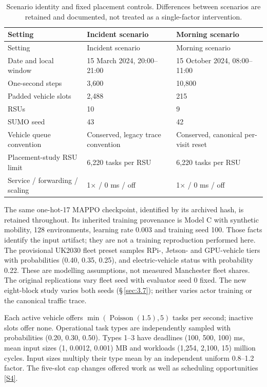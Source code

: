 \documentclass[11pt,a4paper]{article}
\begin{document}
\begingroup
\small
\begin{xltabular}{\textwidth}{@{}YYY@{}}
\caption{Scenario identity and fixed placement controls. Differences between scenarios are retained and documented, not treated as a single-factor intervention.}\label{tab:2} \\
\toprule
Setting & Incident scenario & Morning scenario \\
\midrule\endfirsthead
\toprule
Setting & Incident scenario & Morning scenario \\
\midrule\endhead
\bottomrule\endfoot
Date and local window & 15 March 2024, 20:00--21:00 & 15 October 2024, 08:00--11:00 \\
One-second steps & 3,600 & 10,800 \\
Padded vehicle slots & 2,488 & 215 \\
RSUs & 10 & 9 \\
SUMO seed & 43 & 42 \\
Vehicle queue convention & Conserved, legacy trace convention & Conserved, canonical per-visit reset \\
Placement-study RSU limit & 6,220 tasks per RSU & 6,220 tasks per RSU \\
Service / forwarding / scaling & 1\ensuremath{\times} / 0 ms / off & 1\ensuremath{\times} / 0 ms / off \\
\end{xltabular}
\endgroup

The same one-hot-17 MAPPO checkpoint, identified by its archived hash, is retained throughout. Its inherited training provenance is Model C with synthetic mobility, 128 environments, learning rate 0.003 and training seed 100. Those facts identify the input artifact; they are not a training reproduction performed here. The provisional UK2030 fleet preset samples RPi-, Jetson- and GPU-vehicle tiers with probabilities (0.40, 0.35, 0.25), and electric-vehicle status with probability 0.22. These are modelling assumptions, not measured Manchester fleet shares. The original replications vary fleet seed with evaluator seed 0 fixed. The new eight-block study varies both seeds (\S\,\ref{sec:3.7}); neither varies actor training or the canonical traffic trace.

Each active vehicle offers $\min(\operatorname{Poisson}(1.5),5)$ tasks per second; inactive slots offer none. Operational task types are independently sampled with probabilities (0.20, 0.30, 0.50). Types 1--3 have deadlines (100, 500, 100) ms, mean input sizes (1, 0.0012, 0.001) MB and workloads (1,254, 2,100, 15) million cycles. Input sizes multiply their type mean by an independent uniform 0.8--1.2 factor. The five-slot cap changes offered work as well as scheduling opportunities \hyperref[source-s4]{[S4]}.
\end{document}

